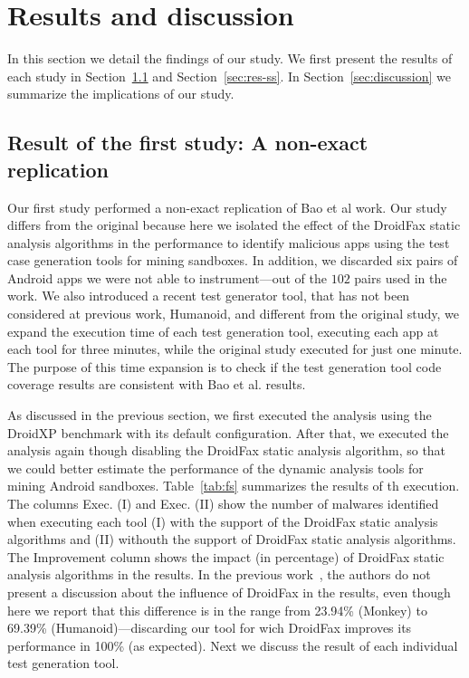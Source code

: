 \section{Results and discussion}

In this section we detail the findings of our study. We first present the results of each study
in Section~\ref{sec:res-fs} and Section~\ref{sec:res-ss}. In Section~\ref{sec:discussion} we summarize the
implications of our study. 

\subsection{Result of the first study: A non-exact replication}\label{sec:res-fs}

Our first study performed a non-exact replication of Bao et al work.
Our study differs from the original because here we isolated the effect
of the DroidFax static analysis algorithms in the performance to
identify malicious apps using the test case generation tools for
mining sandboxes. In addition, we discarded six pairs of
Android apps we were not able to instrument---out of the $102$ pairs used in the \original work.
 {\color{red}We also introduced a recent test generator tool, that has not been considered at previous work, Humanoid, and different from the original study, we expand the execution time of each test generation tool, executing each app at each tool for three minutes, while the original study executed for just one minute. The purpose of this time expansion is to check if the test generation tool code coverage results are consistent with Bao et al. results.}

As discussed in the previous section, we first executed the analysis using the DroidXP benchmark with its default configuration. After that, we executed the analysis again though disabling the DroidFax static analysis algorithm, so that we could better estimate the performance of the dynamic analysis tools for mining Android sandboxes. Table~\ref{tab:fs} summarizes the results of th execution. The columns Exec. (I) and Exec. (II) 
show the number of malwares identified when executing each tool (I) with the
support of the DroidFax static analysis algorithms and (II) withouth the support
of DroidFax static analysis algorithms. The Improvement column shows the impact
(in percentage) of DroidFax static analysis algorithms in the results.
In the previous work~\cite{}, the authors do not present a
discussion about the influence of DroidFax in the results, even
though here we report that this difference is in the
range from 23.94\% (Monkey) to 69.39\% (Humanoid)---discarding our
\joke tool for wich DroidFax improves its performance in 100\% (as expected).
Next we discuss the result of each individual test generation tool. 

